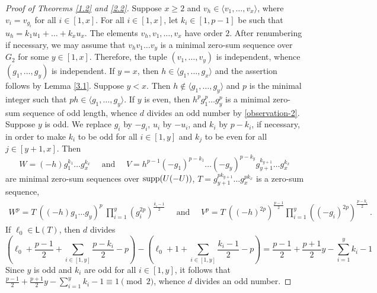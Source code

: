 \documentclass[a4paper,10pt]{amsart}
\theoremstyle{plain}
\theoremstyle{definition}
\numberwithin{equation}{section}
\begin{document}
\begin{proof}[Proof of Theorems \ref{1.2} and \ref{2.2}]
Suppose $x\ge 2$ and $v_h\in \langle v_1, \ldots, v_x \rangle $, where $v_i=v_{g_i}$ for all $i\in [1,x]$. For all $i \in [1,x]$, let $k_i\in [1,p-1]$ be such that  $u_h=k_1u_1+\ldots + k_xu_x$. The elements $v_h, v_1, \ldots, v_x$ have order $2$.	After renumbering if necessary, we may  assume that $v_hv_1\ldots v_y$ is a minimal zero-sum sequence over $G_2$ for some $y \in [1, x]$. Therefore, the tuple $(v_1,\ldots, v_y)$ is independent, whence  $(g_1,\ldots, g_y)$ is independent. If $y=x$, then $h\in \langle g_1,\ldots, g_x\rangle$ and
the assertion follows by Lemma \ref{3.1}. Suppose $y<x$. Then $h\not\in \langle g_1, \ldots, g_y\rangle$ and $p$ is the minimal integer such that $ph\in \langle g_1, \ldots, g_y\rangle$.
If $y$ is even,  then $h^pg_1^p\ldots g_y^p$ is a minimal zero-sum sequence of odd length, whence $d$ divides an odd number  by \eqref{observation-2}. Suppose $y$ is odd. We replace $g_i$ by $-g_i$, $u_i$ by $-u_i$, and $k_i$ by $p-k_i$, if necessary, in order to make $k_i$ to be odd for all $i\in [1,y]$ and $k_j$ to be even for all $j\in [y+1,x]$. Then
\[
W=(-h)g_1^{k_1}\ldots g_x^{k_x} \quad \text{ and } \quad V=h^{p-1}(-g_1)^{p-k_1}\ldots (-g_y)^{p-k_y}g_{y+1}^{k_{y+1}}\ldots g_x^{k_x}
\]
are  minimal zero-sum sequences over $\operatorname{supp}(U(-U))$,  $T=g_{y+1}^{pk_{y+1}}\ldots g_x^{pk_x}$  is a zero-sum sequence,
\begin{align*}
W^p=T \ ((-h)g_1\ldots g_y)^p\ \prod_{i=1}^y (g_i^{2p})^{\frac{k_i-1}{2}} \quad \text{ and } \quad V^p=T \ ((-h)^{2p})^{\frac{p-1}{2} }\prod_{i=1}^y((-g_i)^{2p})^{\frac{p-k_i}{2}}\,.
\end{align*}
If $\ell_0\in \mathsf L(T)$, then $d$ divides
\[
\left(\ell_0+\frac{p-1}{2}+\sum_{i\in [1,y]}\frac{p-k_i}{2}-p\right)-\left(\ell_0+1+\sum_{i\in [1,y]}\frac{k_i-1}{2}-p\right)    =\frac{p-1}{2}+\frac{p+1}{2}y-\sum_{i=1}^yk_i-1
\]
Since $y$ is odd and $k_i$ are odd for all $i\in [1,y]$, it follows that $\frac{p-1}{2}+\frac{p+1}{2}y-\sum_{i=1}^yk_i-1\equiv 1\pmod 2$, whence $d$ divides an odd number.





\end{proof}
\end{document}
